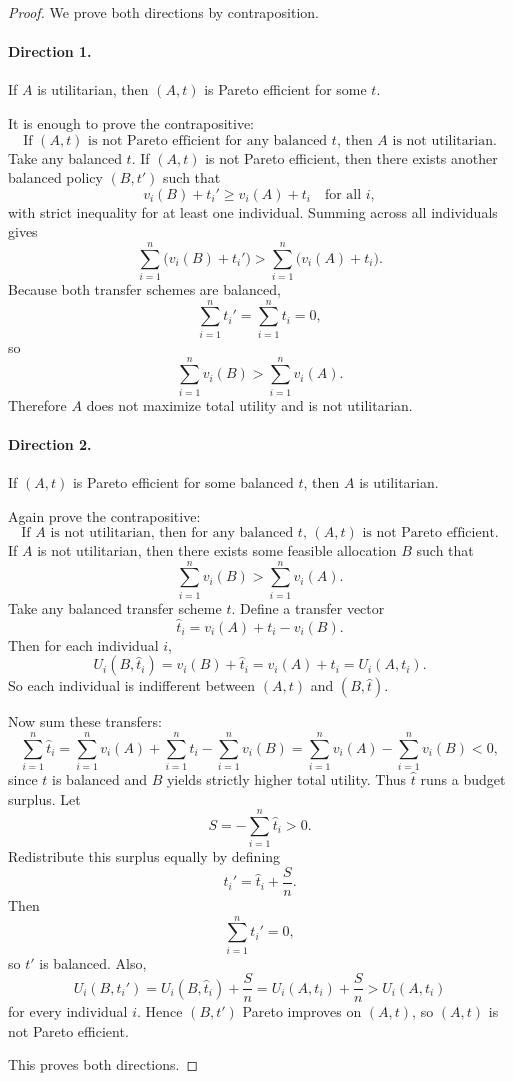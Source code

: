 \begin{proof}
We prove both directions by contraposition.

\paragraph{Direction 1.} If $A$ is utilitarian, then $(A,t)$ is Pareto efficient for some $t$.

It is enough to prove the contrapositive:
\[
\text{If $(A,t)$ is not Pareto efficient for any balanced $t$, then $A$ is not utilitarian.}
\]
Take any balanced $t$. If $(A,t)$ is not Pareto efficient, then there exists another balanced policy $(B,t')$ such that
\[
v_i(B)+t_i' \ge v_i(A)+t_i
\quad \text{for all } i,
\]
with strict inequality for at least one individual. Summing across all individuals gives
\[
\sum_{i=1}^n \bigl(v_i(B)+t_i'\bigr)
>
\sum_{i=1}^n \bigl(v_i(A)+t_i\bigr).
\]
Because both transfer schemes are balanced,
\[
\sum_{i=1}^n t_i'=\sum_{i=1}^n t_i=0,
\]
so
\[
\sum_{i=1}^n v_i(B) > \sum_{i=1}^n v_i(A).
\]
Therefore $A$ does not maximize total utility and is not utilitarian.

\paragraph{Direction 2.} If $(A,t)$ is Pareto efficient for some balanced $t$, then $A$ is utilitarian.

Again prove the contrapositive:
\[
\text{If $A$ is not utilitarian, then for any balanced $t$, $(A,t)$ is not Pareto efficient.}
\]
If $A$ is not utilitarian, then there exists some feasible allocation $B$ such that
\[
\sum_{i=1}^n v_i(B) > \sum_{i=1}^n v_i(A).
\]
Take any balanced transfer scheme $t$. Define a transfer vector
\[
\hat t_i = v_i(A)+t_i-v_i(B).
\]
Then for each individual $i$,
\[
U_i(B,\hat t_i)=v_i(B)+\hat t_i = v_i(A)+t_i = U_i(A,t_i).
\]
So each individual is indifferent between $(A,t)$ and $(B,\hat t)$.

Now sum these transfers:
\[
\sum_{i=1}^n \hat t_i
=
\sum_{i=1}^n v_i(A)+\sum_{i=1}^n t_i-\sum_{i=1}^n v_i(B)
=
\sum_{i=1}^n v_i(A)-\sum_{i=1}^n v_i(B)
<0,
\]
since $t$ is balanced and $B$ yields strictly higher total utility. Thus $\hat t$ runs a budget surplus. Let
\[
S = -\sum_{i=1}^n \hat t_i > 0.
\]
Redistribute this surplus equally by defining
\[
t_i'=\hat t_i + \frac{S}{n}.
\]
Then
\[
\sum_{i=1}^n t_i' = 0,
\]
so $t'$ is balanced. Also,
\[
U_i(B,t_i') = U_i(B,\hat t_i)+\frac{S}{n}
= U_i(A,t_i)+\frac{S}{n}
> U_i(A,t_i)
\]
for every individual $i$. Hence $(B,t')$ Pareto improves on $(A,t)$, so $(A,t)$ is not Pareto efficient.

This proves both directions.
\end{proof}

